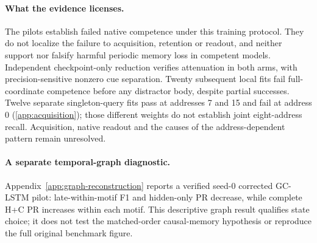 \paragraph{What the evidence licenses.}
The pilots establish failed native competence under this training protocol.
They do not localize the failure to acquisition, retention or readout, and
neither support nor falsify harmful periodic memory loss in competent models.
Independent checkpoint-only reduction verifies attenuation in both arms, with
precision-sensitive nonzero cue separation. Twenty subsequent local fits fail
full-coordinate competence before any distractor body, despite partial successes.
Twelve separate singleton-query fits pass at addresses 7 and 15 and fail at
address 0 (\cref{app:acquisition}); those different weights do not establish
joint eight-address recall. Acquisition, native readout and the causes of the
address-dependent pattern remain unresolved.

\paragraph{A separate temporal-graph diagnostic.}
Appendix~\ref{app:graph-reconstruction} reports a verified seed-0 corrected
GC-LSTM pilot: late-within-motif F1 and hidden-only PR decrease, while
complete H+C PR increases within each motif. This descriptive graph result
qualifies state choice; it does not test the matched-order causal-memory
hypothesis or reproduce the full original benchmark figure.
